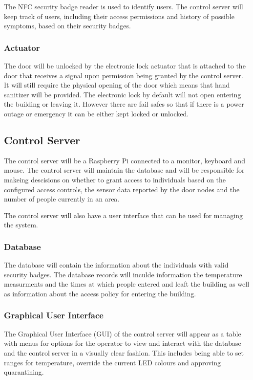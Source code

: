 The NFC security badge reader is used to identify users. The control server will
keep track of users, including their access permissions and history of possible
symptoms, based on their security badges.

\subsubsection{Actuator}
The door will be unlocked by the electronic lock actuator that is attached to 
the door that receives a signal upon permission being granted by the control server. 
It will still require the physical opening of the door which means
that hand sanitizer will be provided. The electronic lock by default 
will not open entering the building or leaving it. 
However there are fail safes so that if there is a power outage or emergency 
it can be either kept locked or unlocked.

\subsection{Control Server}
The control server will be a Raspberry Pi connected to a monitor, keyboard and
mouse. The control server will maintain the database and will be responsible for
makeing descisions on whether to grant access to individuals based on the
configured access controls, the sensor data reported by the door nodes and the 
number of people currently in an area. 

The control server will also have a user interface that can be used for managing
the system.

\subsubsection{Database}
The database will contain the information about the individuals with valid
security badges. The database records will inculde information the temperature
measurments and the times at which people entered and leaft the building as well
as information about the access policy for entering the building.

\subsubsection{Graphical User Interface}
The Graphical User Interface (GUI) of the control server will appear as a table
with menus for options for the operator to view and interact with the database 
and the control server in a visually clear fashion. 
This includes being able to set ranges for temperature, 
override the current LED colours and approving quarantining.


